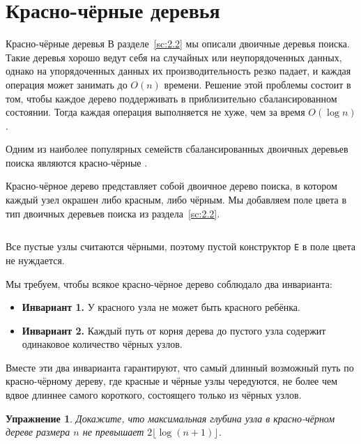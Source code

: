 \documentclass[aspectratio=169
  , xcolor={svgnames}
  , hyperref={ colorlinks,citecolor=DeepPink4
             , linkcolor=DarkRed,urlcolor=DarkBlue}
  , russian
  ]{beamer}
\theoremstyle{exerciseStyle1}
\newtheorem{exercise}{\textbf{Упражнение}}[section]
\renewcommand{\cite}[1]{}
\begin{document}

\fi

\section{Красно-чёрные деревья}
\label{sc:3.3}

\begin{frame}[fragile]{Красно-чёрные деревья}
В разделе~\ref{sc:2.2} мы описали двоичные деревья поиска. Такие
деревья хорошо ведут себя на случайных или неупорядоченных данных,
однако на упорядоченных данных их производительность резко падает, и
каждая операция может занимать до $O(n)$  времени.  Решение этой
проблемы состоит в том, чтобы каждое дерево поддерживать в
приблизительно сбалансированном состоянии. Тогда каждая операция
выполняется не хуже, чем за время $O(\log n)$. 

 Одним из наиболее
популярных семейств сбалансированных двоичных деревьев поиска являются
красно-чёрные \cite{GuibasSedgewick1978}.
\end{frame}

\begin{frame}[fragile]{}
Красно-чёрное дерево представляет собой двоичное дерево поиска, в
котором каждый узел окрашен либо красным, либо чёрным. Мы добавляем
поле цвета в тип двоичных деревьев поиска из раздела~\ref{sc:2.2}.

\inputminted[firstline=6,lastline=7] {haskell}{code/RedBlackSet.lhs}
Все пустые узлы считаются чёрными, поэтому пустой конструктор
\lstinline!E! в поле цвета не нуждается.

\end{frame}

\begin{frame}[fragile]{}
Мы требуем, чтобы всякое красно-чёрное дерево соблюдало два
инварианта:
\begin{itemize}
  \item \textbf{Инвариант 1.} У красного узла не может быть красного ребёнка.
  \item \textbf{Инвариант 2.} Каждый путь от корня дерева до пустого
  узла содержит одинаковое количество чёрных узлов.
\end{itemize}
Вместе эти два инварианта гарантируют, что самый длинный возможный
путь по красно-чёрному дереву, где красные и чёрные узлы чередуются,
не более чем вдвое длиннее самого короткого, состоящего только из
чёрных узлов.

\ifanswers
\begin{exercise}\label{ex:3.8}
  Докажите, что максимальная глубина узла в красно-чёрном дереве
  размера $n$ не превышает $2 \lfloor \log (n+1) \rfloor$.
\end{exercise}
\fi
\end{frame}
\end{document}
